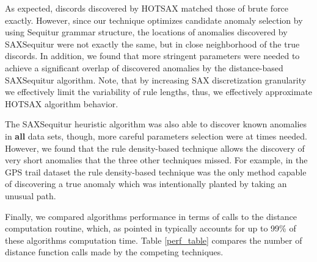 \documentclass{llncs}
\begin{document}
As expected, discords discovered by HOTSAX matched those of brute force exactly. However, since our technique optimizes candidate anomaly selection by using Sequitur grammar structure, the locations of anomalies discovered by SAXSequitur were not exactly the same, but in close neighborhood of the true discords. In addition, we found that more stringent parameters were needed to achieve a significant overlap of discovered anomalies by the distance-based SAXSequitur algorithm. Note, that by increasing SAX discretization granularity we effectively limit the variability of rule lengths, thus, we effectively approximate HOTSAX algorithm behavior. %

The SAXSequitur heuristic algorithm was also able to discover known anomalies in \textbf{all} data sets, though, more careful parameters selection were at times needed. However, we found that the rule density-based technique allows the discovery of very short anomalies that the three other techniques missed. For example, in the GPS trail dataset the rule density-based technique was the only method capable of discovering a true anomaly which was intentionally planted by taking an unusual path.


Finally, we compared algorithms performance in terms of calls to the distance computation routine, which, as pointed in \cite{hot_sax} typically accounts for up to 99\% of
these algorithms computation time. Table \ref{perf_table} compares the number of distance function calls made by the competing techniques. 
\end{document}
